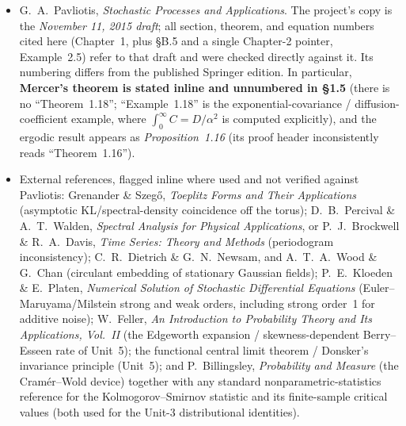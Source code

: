 \documentclass[11pt]{article}
\begin{document}
\begin{itemize}[leftmargin=1.4cm]
  \item G.~A.~Pavliotis, \emph{Stochastic Processes and Applications}. The project's copy is the
  \emph{November 11, 2015 draft}; all section, theorem, and equation numbers cited here (Chapter~1,
  plus \S B.5 and a single Chapter-2 pointer, Example~2.5) refer to that draft and were checked
  directly against it. Its numbering differs from the published Springer edition. In particular,
  \textbf{Mercer's theorem is stated inline and unnumbered in \S1.5} (there is no ``Theorem~1.18'';
  ``Example~1.18'' is the exponential-covariance / diffusion-coefficient example, where
  $\int_0^\infty C = D/\alpha^2$ is computed explicitly), and the ergodic result appears as
  \emph{Proposition~1.16} (its proof header inconsistently reads ``Theorem~1.16'').
  \item External references, flagged inline where used and not verified against Pavliotis: Grenander \&
  Szeg\H{o}, \emph{Toeplitz Forms and Their Applications} (asymptotic KL/spectral-density coincidence
  off the torus); D.~B.~Percival \& A.~T.~Walden, \emph{Spectral Analysis for Physical Applications},
  or P.~J.~Brockwell \& R.~A.~Davis, \emph{Time Series: Theory and Methods} (periodogram
  inconsistency); C.~R.~Dietrich \& G.~N.~Newsam, and A.~T.~A.~Wood \& G.~Chan (circulant embedding of
  stationary Gaussian fields); P.~E.~Kloeden \& E.~Platen, \emph{Numerical Solution of Stochastic
  Differential Equations} (Euler--Maruyama/Milstein strong and weak orders, including strong order~1
  for additive noise); W.~Feller, \emph{An Introduction to Probability Theory and Its Applications,
  Vol.~II} (the Edgeworth expansion / skewness-dependent Berry--Esseen rate of Unit~5); the functional
  central limit theorem / Donsker's invariance principle (Unit~5); and P.~Billingsley,
  \emph{Probability and Measure} (the Cram\'er--Wold device) together with any standard
  nonparametric-statistics reference for the Kolmogorov--Smirnov statistic and its finite-sample
  critical values (both used for the Unit-3 distributional identities).
\end{itemize}
\end{document}
